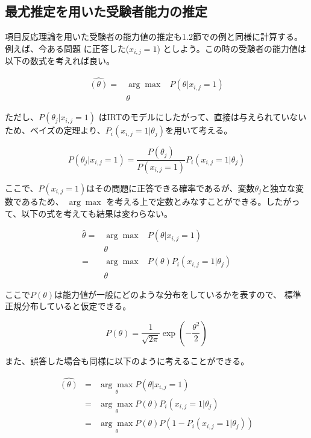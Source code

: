 \documentclass{jsarticle}
\begin{document}
\subsection{最尤推定を用いた受験者能力の推定}
項目反応理論を用いた受験者の能力値の推定も1.2節での例と同様に計算する。例えば、今ある問題
に正答した($x_{i, j} = 1$) としよう。この時の受験者の能力値は以下の数式を考えれば良い。

\begin{eqnarray*}
  \hat{(\theta)} = &\arg \max& P(\theta | x_{i, j} = 1) \\
                 & \theta &
\end{eqnarray*}

ただし、$P({\theta}_j | x_{i, j} = 1)$ はIRTのモデルにしたがって、直接は与えられていない
ため、ベイズの定理より、$P_i(x_{i, j} = 1 | {\theta}_j)$を用いて考える。

$$
  P({\theta}_j | x_{i, j} = 1) = \frac{P({\theta}_j)}{P(x_{i,j} = 1)} P_i(x_{i,j} = 1 | {\theta}_j)
$$

ここで、$P(x_{i,j} = 1)$はその問題に正答できる確率であるが、変数${\theta}_j$と独立な変数であるため、
$\arg \max$ を考える上で定数とみなすことができる。したがって、以下の式を考えても結果は変わらない。
 

 \begin{eqnarray*}
   \hat{\theta} = &\arg \max& P(\theta | x_{i, j} = 1) \\
                  &\theta& \\
                = &\arg \max& P(\theta)P_i(x_{i,j} = 1 | {\theta}_j) \\
                  &\theta&
 \end{eqnarray*}

 ここで$P(\theta)$は能力値が一般にどのような分布をしているかを表すので、
 標準正規分布していると仮定できる。

$$
  P(\theta) = \frac{1}{\sqrt{2 \pi}} \exp(- \frac{{\theta}^2}{2})
$$

また、誤答した場合も同様に以下のように考えることができる。

\begin{eqnarray*}
  \hat{(\theta)} &=& \underset{\theta}{\arg \max} P( \theta | x_{i,j} = 1) \\
                 &=& \underset{\theta}{\arg \max} P( \theta ) P_i(x_{i,j} = 1 | {\theta}_j) \\
                 &=& \underset{\theta}{\arg \max} P( \theta ) P(1 - P_i(x_{i,j} = 1 | {\theta}_j))
\end{eqnarray*}
\end{document}
